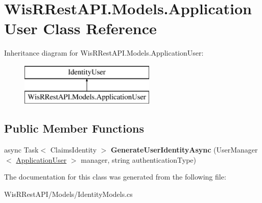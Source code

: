 \hypertarget{class_wis_r_rest_a_p_i_1_1_models_1_1_application_user}{}\section{Wis\+R\+Rest\+A\+P\+I.\+Models.\+Application\+User Class Reference}
\label{class_wis_r_rest_a_p_i_1_1_models_1_1_application_user}
Inheritance diagram for Wis\+R\+Rest\+A\+P\+I.\+Models.\+Application\+User\+:\begin{figure}[H]
\begin{center}
\leavevmode
\includegraphics[height=2.000000cm]{class_wis_r_rest_a_p_i_1_1_models_1_1_application_user}
\end{center}
\end{figure}
\subsection*{Public Member Functions}
\begin{DoxyCompactItemize}
\item 
\hypertarget{class_wis_r_rest_a_p_i_1_1_models_1_1_application_user_a1f9ec30bb00a268ec98a58d03dbc9689}{}async Task$<$ Claims\+Identity $>$ {\bfseries Generate\+User\+Identity\+Async} (User\+Manager$<$ \hyperlink{class_wis_r_rest_a_p_i_1_1_models_1_1_application_user}{Application\+User} $>$ manager, string authentication\+Type)\label{class_wis_r_rest_a_p_i_1_1_models_1_1_application_user_a1f9ec30bb00a268ec98a58d03dbc9689}

\end{DoxyCompactItemize}


The documentation for this class was generated from the following file\+:\begin{DoxyCompactItemize}
\item 
Wis\+R\+Rest\+A\+P\+I/\+Models/Identity\+Models.\+cs\end{DoxyCompactItemize}
